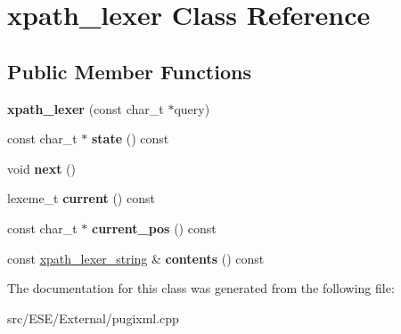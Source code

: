 \hypertarget{classxpath__lexer}{\section{xpath\-\_\-lexer Class Reference}
\label{classxpath__lexer}
}
\subsection*{Public Member Functions}
\begin{DoxyCompactItemize}
\item 
\hypertarget{classxpath__lexer_aa52661c9ba7dfa262d3ab49f578653c3}{{\bfseries xpath\-\_\-lexer} (const char\-\_\-t $\ast$query)}\label{classxpath__lexer_aa52661c9ba7dfa262d3ab49f578653c3}

\item 
\hypertarget{classxpath__lexer_a3794e29f3bec2fa31346766eea978cbf}{const char\-\_\-t $\ast$ {\bfseries state} () const }\label{classxpath__lexer_a3794e29f3bec2fa31346766eea978cbf}

\item 
\hypertarget{classxpath__lexer_a32684b3097fccb4d626da620b44b72ad}{void {\bfseries next} ()}\label{classxpath__lexer_a32684b3097fccb4d626da620b44b72ad}

\item 
\hypertarget{classxpath__lexer_a06cdc258948ef3a1a69bd7d5733fd987}{lexeme\-\_\-t {\bfseries current} () const }\label{classxpath__lexer_a06cdc258948ef3a1a69bd7d5733fd987}

\item 
\hypertarget{classxpath__lexer_a7adef722d64938e3ba79ae1a7e1c0d71}{const char\-\_\-t $\ast$ {\bfseries current\-\_\-pos} () const }\label{classxpath__lexer_a7adef722d64938e3ba79ae1a7e1c0d71}

\item 
\hypertarget{classxpath__lexer_aebb02b6d507f5e0839bfa42116bdbc9c}{const \hyperlink{structxpath__lexer__string}{xpath\-\_\-lexer\-\_\-string} \& {\bfseries contents} () const }\label{classxpath__lexer_aebb02b6d507f5e0839bfa42116bdbc9c}

\end{DoxyCompactItemize}


The documentation for this class was generated from the following file\-:\begin{DoxyCompactItemize}
\item 
src/\-E\-S\-E/\-External/pugixml.\-cpp\end{DoxyCompactItemize}
